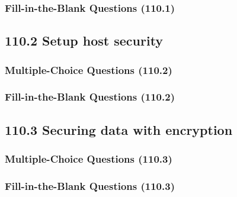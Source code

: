 \documentclass[a4paper]{report}
\begin{document}
\subsubsection*{Fill-in-the-Blank Questions (110.1)}

\subsection*{110.2 Setup host security}
\subsubsection*{Multiple-Choice Questions (110.2)}

\subsubsection*{Fill-in-the-Blank Questions (110.2)}

\subsection*{110.3 Securing data with encryption}
\subsubsection*{Multiple-Choice Questions (110.3)}

\subsubsection*{Fill-in-the-Blank Questions (110.3)}
\end{document}
